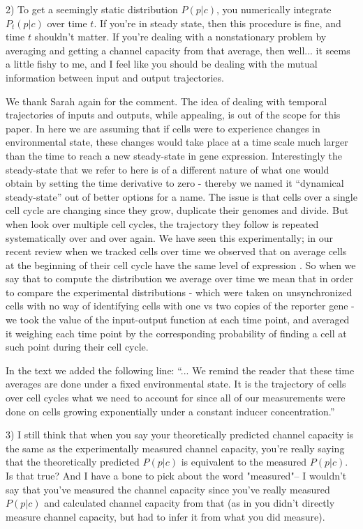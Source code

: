 \begin{tcolorbox}
2)  To get a seemingly static distribution $P(p|c)$, you numerically integrate
$P_t(p|c)$ over time $t$.  If you're in steady state, then this procedure is
fine, and time $t$ shouldn't matter.  If you're dealing with a nonstationary
problem by averaging and getting a channel capacity from that average, then
well... it seems a little fishy to me, and I feel like you should be dealing
with the mutual information between input and output trajectories.
\end{tcolorbox}
We thank Sarah again for the comment. The idea of dealing with temporal
trajectories of inputs and outputs, while appealing, is out of the scope for
this paper. In here we are assuming that if cells were to experience changes
in environmental state, these changes would take place at a time scale much
larger than the time to reach a new steady-state in gene expression.
Interestingly the steady-state that we refer to here is of a different nature of
what one would obtain by setting the time derivative to zero - thereby we named
it ``dynamical steady-state'' out of better options for a name. The issue is
that cells over a single cell cycle are changing since they grow, duplicate
their genomes and divide. But when look over multiple cell cycles, the
trajectory they follow is repeated systematically over and over again. We have
seen this experimentally; in our recent review when we tracked cells over time
we observed that on average cells at the beginning of their cell cycle have the
same level of expression \cite{Phillips2019}. So when we say that to compute the
distribution we average over time we mean that in order to compare the
experimental distributions - which were taken on unsynchronized cells with no
way of identifying cells with one vs two copies of the reporter gene - we took
the value of the input-output function at each time point, and averaged it
weighing each time point by the corresponding probability of finding a cell at
such point during their cell cycle.

In the text we added the following line:
``... We remind the reader that these time averages are done under a fixed
environmental state. It is the trajectory of cells over cell cycles what we need
to account for since all of our measurements were done on cells growing
exponentially under a constant inducer concentration.''

\begin{tcolorbox}
3)  I still think that when you say your theoretically predicted channel
capacity is the same as the experimentally measured channel capacity, you're
really saying that the theoretically predicted $P(p|c)$ is equivalent to the
measured $P(p|c)$.  Is that true?  And I have a bone to pick about the word
"measured"-- I wouldn't say that you've measured the channel capacity since
you've really measured $P(p|c)$ and calculated channel capacity from that (as in
you didn't directly measure channel capacity, but had to infer it from what you
did measure).
\end{tcolorbox}

